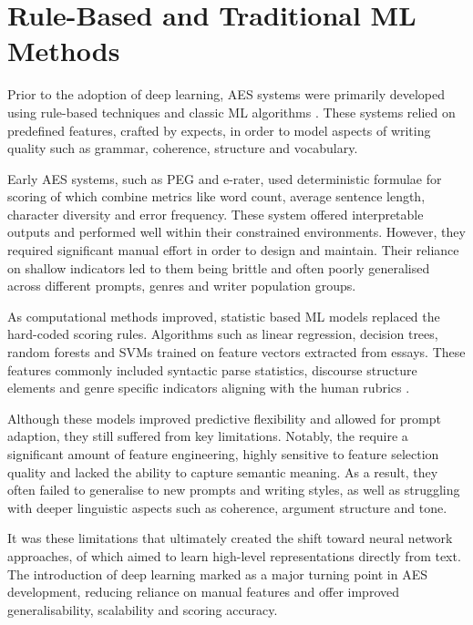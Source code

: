 \documentclass[12pt,a4paper]{report}
\begin{document}
\section{Rule-Based and Traditional ML Methods}
Prior to the adoption of deep learning, AES systems were primarily developed using rule-based techniques and classic ML algorithms \citep{shermis2013handbook}. These systems relied on predefined features, crafted by expects, in order to model aspects of writing quality such as grammar, coherence, structure and vocabulary. 

Early AES systems, such as PEG and e-rater, used deterministic formulae for scoring of which combine metrics like word count, average sentence length, character diversity and error frequency. These system offered interpretable outputs and performed well within their constrained environments. However, they required significant manual effort in order to design and maintain. Their reliance on shallow indicators led to them being brittle and often poorly generalised across different prompts, genres and writer population groups.

As computational methods improved, statistic based ML models replaced the hard-coded scoring rules. Algorithms such as linear regression, decision trees, random forests and SVMs trained on feature vectors extracted from essays. These features commonly included syntactic parse statistics, discourse structure elements and genre specific indicators aligning with the human rubrics \citep{taghipour2016neural}.

Although these models improved predictive flexibility and allowed for prompt adaption,   they still suffered from key limitations. Notably, the require a significant amount of feature engineering, highly sensitive to feature selection quality and lacked the ability to capture semantic meaning. As a result, they often failed to generalise to new prompts and writing styles, as well as struggling with deeper linguistic aspects such as coherence, argument structure and tone. 

It was these limitations that ultimately created the shift toward neural network approaches, of which aimed to learn high-level representations directly from text. The introduction of deep learning marked as a major turning point in AES development, reducing reliance on manual features and offer improved generalisability, scalability and scoring accuracy. 
\end{document}
